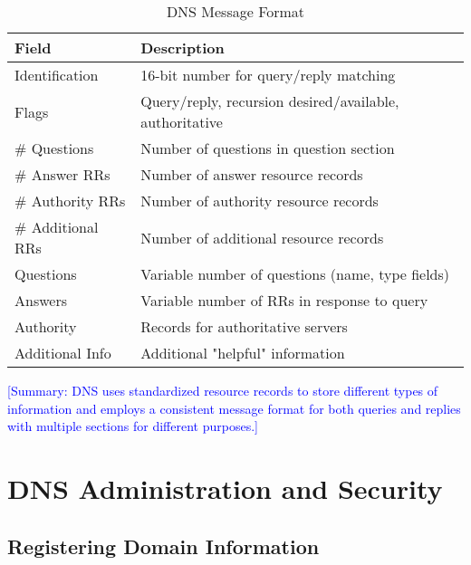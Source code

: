 \documentclass[12pt]{article}
\begin{document}
\begin{table}[h]
    \centering
    \begin{tabular}{|l|l|}
        \hline
        \textbf{Field}    & \textbf{Description}                                    \\
        \hline
        Identification    & 16-bit number for query/reply matching                  \\
        \hline
        Flags             & Query/reply, recursion desired/available, authoritative \\
        \hline
        \# Questions      & Number of questions in question section                 \\
        \hline
        \# Answer RRs     & Number of answer resource records                       \\
        \hline
        \# Authority RRs  & Number of authority resource records                    \\
        \hline
        \# Additional RRs & Number of additional resource records                   \\
        \hline
        Questions         & Variable number of questions (name, type fields)        \\
        \hline
        Answers           & Variable number of RRs in response to query             \\
        \hline
        Authority         & Records for authoritative servers                       \\
        \hline
        Additional Info   & Additional "helpful" information                        \\
        \hline
    \end{tabular}
    \caption{DNS Message Format}
    \label{tab:dns_message}
\end{table}

\textcolor{blue}{[Summary: DNS uses standardized resource records to store different types of information and employs a consistent message format for both queries and replies with multiple sections for different purposes.]}

\section{DNS Administration and Security}
\subsection{Registering Domain Information}
\end{document}
